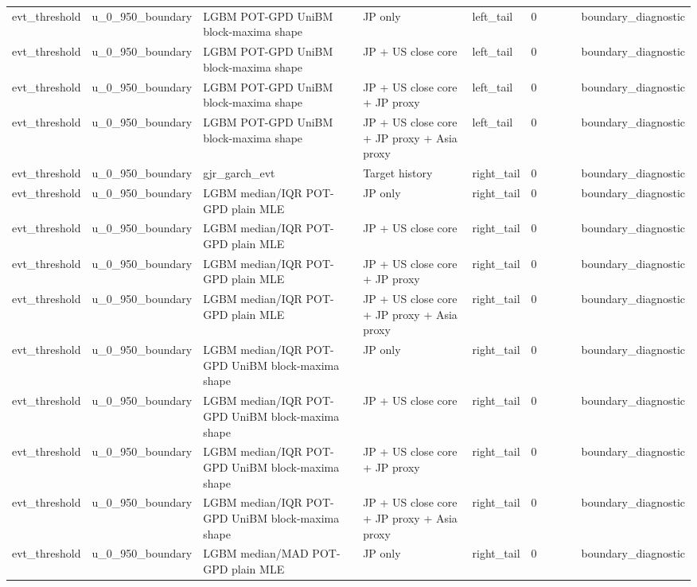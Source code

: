 \begin{tabular}{lll l lrrrrl}
evt\_threshold & u\_0\_950\_boundary & LGBM POT-GPD UniBM block-maxima shape & JP only & left\_tail & 0 &  &  &  & boundary\_diagnostic \\
evt\_threshold & u\_0\_950\_boundary & LGBM POT-GPD UniBM block-maxima shape & JP + US close core & left\_tail & 0 &  &  &  & boundary\_diagnostic \\
evt\_threshold & u\_0\_950\_boundary & LGBM POT-GPD UniBM block-maxima shape & JP + US close core + JP proxy & left\_tail & 0 &  &  &  & boundary\_diagnostic \\
evt\_threshold & u\_0\_950\_boundary & LGBM POT-GPD UniBM block-maxima shape & JP + US close core + JP proxy + Asia proxy & left\_tail & 0 &  &  &  & boundary\_diagnostic \\
evt\_threshold & u\_0\_950\_boundary & gjr\_garch\_evt & Target history & right\_tail & 0 &  &  &  & boundary\_diagnostic \\
evt\_threshold & u\_0\_950\_boundary & LGBM median/IQR POT-GPD plain MLE & JP only & right\_tail & 0 &  &  &  & boundary\_diagnostic \\
evt\_threshold & u\_0\_950\_boundary & LGBM median/IQR POT-GPD plain MLE & JP + US close core & right\_tail & 0 &  &  &  & boundary\_diagnostic \\
evt\_threshold & u\_0\_950\_boundary & LGBM median/IQR POT-GPD plain MLE & JP + US close core + JP proxy & right\_tail & 0 &  &  &  & boundary\_diagnostic \\
evt\_threshold & u\_0\_950\_boundary & LGBM median/IQR POT-GPD plain MLE & JP + US close core + JP proxy + Asia proxy & right\_tail & 0 &  &  &  & boundary\_diagnostic \\
evt\_threshold & u\_0\_950\_boundary & LGBM median/IQR POT-GPD UniBM block-maxima shape & JP only & right\_tail & 0 &  &  &  & boundary\_diagnostic \\
evt\_threshold & u\_0\_950\_boundary & LGBM median/IQR POT-GPD UniBM block-maxima shape & JP + US close core & right\_tail & 0 &  &  &  & boundary\_diagnostic \\
evt\_threshold & u\_0\_950\_boundary & LGBM median/IQR POT-GPD UniBM block-maxima shape & JP + US close core + JP proxy & right\_tail & 0 &  &  &  & boundary\_diagnostic \\
evt\_threshold & u\_0\_950\_boundary & LGBM median/IQR POT-GPD UniBM block-maxima shape & JP + US close core + JP proxy + Asia proxy & right\_tail & 0 &  &  &  & boundary\_diagnostic \\
evt\_threshold & u\_0\_950\_boundary & LGBM median/MAD POT-GPD plain MLE & JP only & right\_tail & 0 &  &  &  & boundary\_diagnostic \\

\end{tabular}
